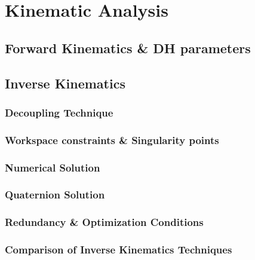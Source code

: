 \section{Kinematic Analysis}
\subsection{Forward Kinematics \& DH parameters}
\subsection{Inverse Kinematics}
\subsubsection{Decoupling Technique}
\subsubsection{Workspace constraints \& Singularity points}
\subsubsection{Numerical Solution}
\subsubsection{Quaternion Solution}
\subsubsection{Redundancy \& Optimization Conditions}
\subsubsection{Comparison of Inverse Kinematics Techniques}